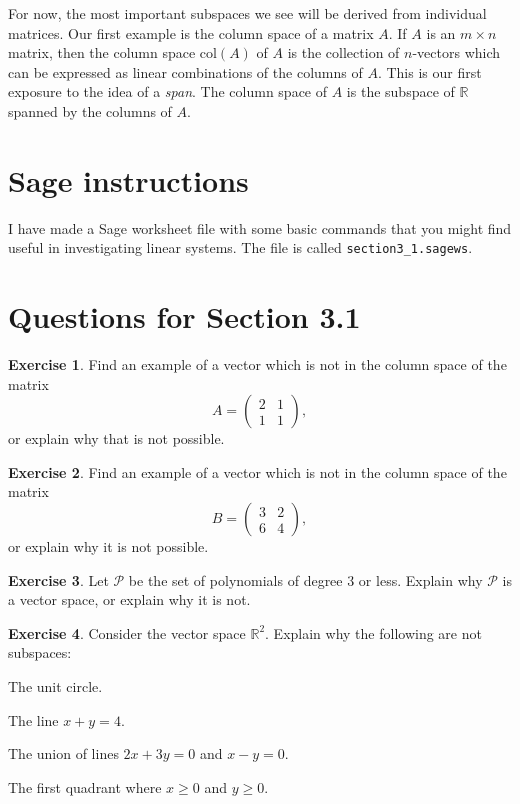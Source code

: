 \documentclass[11pt]{amsart}
\theoremstyle{definition}
\newtheorem{exercise}{Exercise}
\begin{document}
For now, the most important subspaces we see will be derived from individual matrices. Our first example is the column space of a matrix $A$. If $A$ is an $m\times n$ matrix, then the column space $\mathrm{col}(A)$ of $A$ is the collection of $n$-vectors which can be expressed as linear combinations of the columns of $A$. This is our first exposure to the idea of a \emph{span}. The column space of $A$ is the subspace of $\mathbb{R}$ spanned by the columns of $A$.


\section{Sage instructions}

I have made a Sage worksheet file with some basic commands that you might find useful in investigating linear systems. The file is called \texttt{section3\_1.sagews}.


\section{Questions for Section 3.1}
\setcounter{exercise}{77}

\begin{exercise}
Find an example of a vector which is not in the column space of the matrix $$A = \begin{pmatrix} 2 & 1  \\ 1 & 1 \end{pmatrix},$$ or explain why that is not possible.
\end{exercise}

\begin{exercise}
Find an example of a vector which is not in the column space of the matrix $$B = \begin{pmatrix} 3 & 2 \\ 6 & 4 \end{pmatrix},$$ or explain why it is not possible.
\end{exercise}

\begin{exercise}
Let $\mathcal{P}$ be the set of polynomials of degree 3 or less. Explain why $\mathcal{P}$ is a vector space, or explain why it is not.
\end{exercise}

\begin{exercise}
Consider the vector space $\mathbb{R}^2$. Explain why the following are not subspaces:
\begin{compactitem}
\item The unit circle.
\item The line $x+y = 4$.
\item The union of lines $2x+3y = 0$ and $x-y=0$.
\item The first quadrant where $x\geq 0$ and $y\geq 0$.
\end{compactitem}
\end{exercise}
\end{document}
